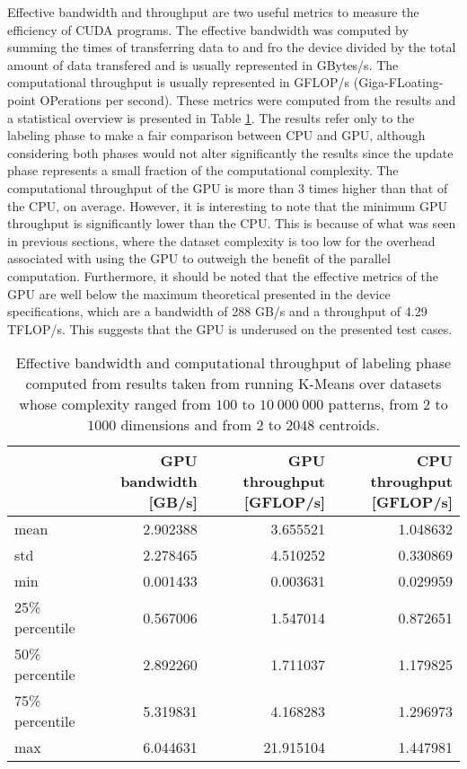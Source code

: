 Effective bandwidth and throughput are two useful metrics to measure the efficiency of CUDA programs.
The effective bandwidth was computed by summing the times of transferring data to and fro the device divided by the total amount of data transfered and is usually represented in GBytes/s.
The computational throughput is usually represented in GFLOP/s (Giga-FLoating-point OPerations per second).
These metrics were computed from the results and a statistical overview is presented in Table \ref{tab:kmeans performance metrics}.
The results refer only to the labeling phase to make a fair comparison between CPU and GPU, although considering both phases would not alter significantly the results since the update phase represents a small fraction of the computational complexity.
The computational throughput of the GPU is more than 3 times higher than that of the CPU, on average.
However, it is interesting to note that the minimum GPU throughput is significantly lower than the CPU.
This is because of what was seen in previous sections, where the dataset complexity is too low for the overhead associated with using the GPU to outweigh the benefit of the parallel computation.
Furthermore, it should be noted that the effective metrics of the GPU are well below the maximum theoretical presented in the device specifications, which are a bandwidth of 288 GB/s and a throughput of 4.29 TFLOP/s.
This suggests that the GPU is underused on the presented test cases. %

\begin{table}[ht]
\centering
\caption{Effective bandwidth and computational throughput of labeling phase computed from results taken from running K-Means over datasets whose complexity ranged from $100$ to $10 \: 000 \: 000$ patterns, from $2$ to $1000$ dimensions and from $2$ to $2048$ centroids.}

\begin{tabular}{lrrr}
\toprule
{} &  GPU bandwidth [GB/s] &  GPU throughput [GFLOP/s] &  CPU throughput [GFLOP/s] \\
\midrule
mean             &         2.902388 &    3.655521 &        1.048632 \\
std              &         2.278465 &    4.510252 &        0.330869 \\
min              &         0.001433 &    0.003631 &        0.029959 \\
25\% percentile &         0.567006 &    1.547014 &        0.872651 \\
50\% percentile  &         2.892260 &    1.711037 &        1.179825 \\
75\% percentile  &         5.319831 &    4.168283 &        1.296973 \\
max             &         6.044631 &   21.915104 &        1.447981 \\
\bottomrule
\end{tabular}

\label{tab:kmeans performance metrics}
\end{table}

